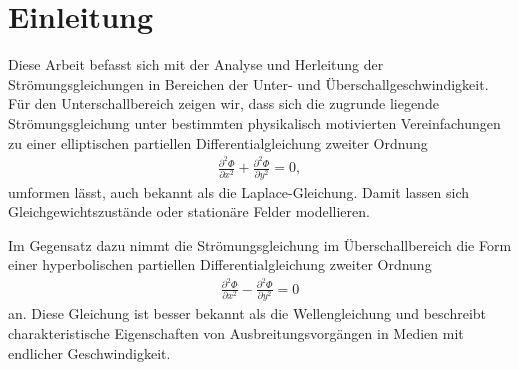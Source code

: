 %
%
%
%
\section{Einleitung\label{ueberschall:Einleitung}}
Diese Arbeit befasst sich mit der Analyse und Herleitung 
der Strömungsgleichungen in Bereichen der
Unter- und Überschallgeschwindigkeit. 
Für den Unterschallbereich zeigen wir, 
dass sich die zugrunde liegende Strömungsgleichung 
unter bestimmten physikalisch motivierten 
Vereinfachungen zu einer elliptischen 
partiellen Differentialgleichung zweiter Ordnung 
\begin{align*}
    \frac{\partial^2 \Phi}{\partial x^2} 
    +
    \frac{\partial^2 \Phi}{\partial y^2} 
    = 
    0, 
\end{align*}
umformen lässt,
auch bekannt als die Laplace-Gleichung.
Damit lassen sich Gleichgewichtszustände oder
stationäre Felder modellieren.

Im Gegensatz dazu nimmt die Strömungsgleichung 
im Überschallbereich die Form einer hyperbolischen 
partiellen Differentialgleichung zweiter Ordnung
\begin{align}
\frac{\partial^2 \Phi}{\partial x^2}
- 
\frac{\partial^2 \Phi}{\partial y^2} 
= 
0\label{eq:wellengleichung}
\end{align}
an.
Diese Gleichung ist besser bekannt als die Wellengleichung 
und beschreibt charakteristische Eigenschaften 
von Ausbreitungsvorgängen in Medien mit endlicher 
Geschwindigkeit.

